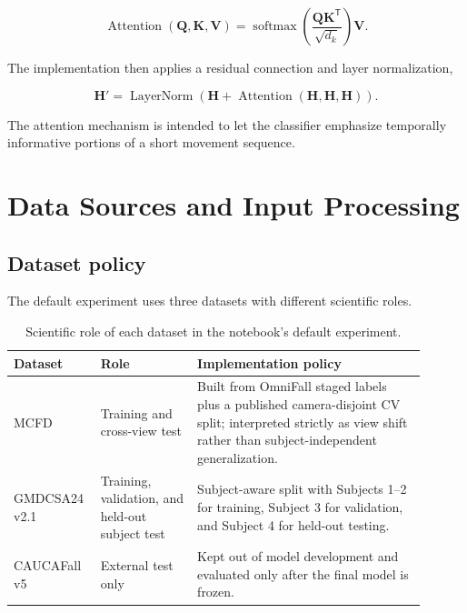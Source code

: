 \documentclass[11pt,a4paper]{article}
\begin{document}
\begin{equation}
\operatorname{Attention}(\mathbf{Q},\mathbf{K},\mathbf{V})
=
\operatorname{softmax}
\left(
\frac{\mathbf{Q}\mathbf{K}^{\mathsf T}}
{\sqrt{d_k}}
\right)
\mathbf{V}.
\end{equation}

The implementation then applies a residual connection and layer normalization,

\begin{equation}
\mathbf{H}' =
\operatorname{LayerNorm}
\left(
\mathbf{H}
+
\operatorname{Attention}(\mathbf{H},\mathbf{H},\mathbf{H})
\right).
\end{equation}

The attention mechanism is intended to let the classifier emphasize temporally informative portions of a short movement sequence.

\section{Data Sources and Input Processing}

\subsection{Dataset policy}

The default experiment uses three datasets with different scientific roles.

\begin{table}[ht]
\centering
\small
\begin{tabular}{p{0.16\linewidth}p{0.22\linewidth}p{0.52\linewidth}}
\toprule
\textbf{Dataset} & \textbf{Role} & \textbf{Implementation policy} \\
\midrule
MCFD & Training and cross-view test & Built from OmniFall staged labels plus a published camera-disjoint CV split; interpreted strictly as view shift rather than subject-independent generalization. \\
GMDCSA24 v2.1 & Training, validation, and held-out subject test & Subject-aware split with Subjects 1--2 for training, Subject 3 for validation, and Subject 4 for held-out testing. \\
CAUCAFall v5 & External test only & Kept out of model development and evaluated only after the final model is frozen. \\
\bottomrule
\end{tabular}
\caption{Scientific role of each dataset in the notebook's default experiment.}
\end{table}
\end{document}
